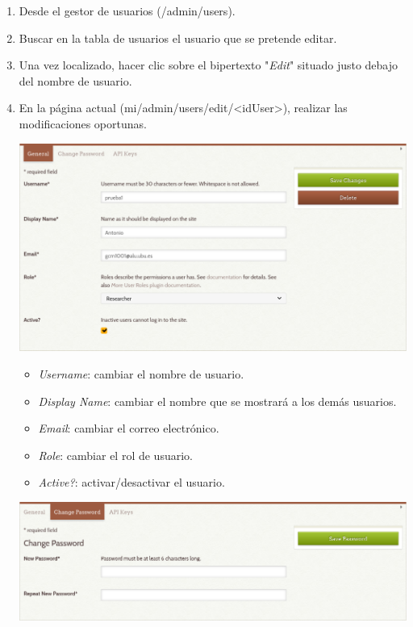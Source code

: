 \documentclass[
]{article}
\providecommand{\tightlist}{%
  \setlength{\itemsep}{0pt}\setlength{\parskip}{0pt}}
\begin{document}
\begin{enumerate}
\def\labelenumi{\arabic{enumi}.}
\item
  Desde el gestor de usuarios ({/admin/users}).
\item
  Buscar en la tabla de usuarios el usuario que se pretende editar.
\item
  Una vez localizado, hacer clic sobre el bipertexto "\emph{Edit}"
  situado justo debajo del nombre de usuario.
\item
  En la página actual
  ({mi/admin/users/edit/\textless idUser\textgreater{}}), realizar las
  modificaciones oportunas.

  \includegraphics{../_static/images/user-mod-1.png}

  \begin{itemize}
  \tightlist
  \item
    \emph{Username}: cambiar el nombre de usuario.
  \item
    \emph{Display Name}: cambiar el nombre que se mostrará a los demás
    usuarios.
  \item
    \emph{Email}: cambiar el correo electrónico.
  \item
    \emph{Role}: cambiar el rol de usuario.
  \item
    \emph{Active?}: activar/desactivar el usuario.
  \end{itemize}

  \includegraphics{../_static/images/user-mod-2.png}


\end{enumerate}
\end{document}
